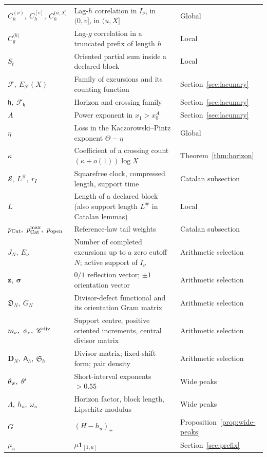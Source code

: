 \documentclass[11pt]{amsart}
\numberwithin{equation}{section}
\theoremstyle{plain}
\theoremstyle{definition}
\theoremstyle{remark}
\newcommand{\Sq}{\mathcal{S}}
\newcommand{\F}{\mathcal{F}}
\begin{document}
\begin{longtable}{@{}p{}p{}p{}@{}}
$C_h^{(\nu)},\ C_h^{[v]},\ C_h^{(u,X]}$ & Lag-$h$ correlation in $I_\nu$, in $(0,v]$, in $(u,X]$ & Global\\
$C_g^{\langle h\rangle}$ & Lag-$g$ correlation in a truncated prefix of length $h$ & Local\\
$S_t$ & Oriented partial sum inside a declared block & Local\\
$\F,\ E_\F(X)$ & Family of excursions and its counting function & Section~\ref{sec:lacunary}\\
$\mathfrak h,\ \F_{\mathfrak h}$ & Horizon and crossing family & Section~\ref{sec:lacunary}\\
$A$ & Power exponent in $x_1>x_0^A$ & Section~\ref{sec:lacunary}\\
$\eta$ & Loss in the Kaczorowski--Pintz exponent $\Theta-\eta$ & Global\\
$\kappa$ & Coefficient of a crossing count $(\kappa+o(1))\log X$ & Theorem~\ref{thm:horizon}\\
$\Sq,\ L^\#,\ r_I$ & Squarefree clock, compressed length, support time & Catalan subsection\\
$L$ & Length of a declared block (also support length $L^\#$ in Catalan lemmas) & Local\\
$p_{\rm Cat},\ p^{\max}_{\rm Cat},\ p_{\rm open}$ & Reference-law tail weights & Catalan subsection\\
$J_N,\ E_\nu$ & Number of completed excursions up to a zero cutoff $N$; active support of $I_\nu$ & Arithmetic selection\\
$\mathbf z,\ \boldsymbol\sigma$ & $0/1$ reflection vector; $\pm1$ orientation vector & Arithmetic selection\\
$\mathfrak D_N,\ G_N$ & Divisor-defect functional and its orientation Gram matrix & Arithmetic selection\\
$m_\nu,\ \phi_\nu,\ \mathscr C^{\rm div}$ & Support centre, positive oriented increments, central divisor matrix & Arithmetic selection\\
$\mathbf D_N,\ \mathsf A_h,\ \mathfrak S_h$ & Divisor matrix; fixed-shift form; pair density & Arithmetic selection\\
$\theta_{\rm w},\ \theta'$ & Short-interval exponents $>0.55$ & Wide peaks\\
$\Lambda,\ h_u,\ \omega_u$ & Horizon factor, block length, Lipschitz modulus & Wide peaks\\
$G$ & $(H-h_u)_+$ & Proposition~\ref{prop:wide-peaks}\\
$\mu_u$ & $\mu\mathbf 1_{[1,u]}$ & Section~\ref{sec:prefix}\\

\end{longtable}
\end{document}
